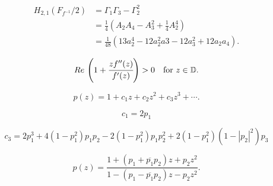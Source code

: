 \documentclass[10pt,a4paper]{amsart}
\begin{document}
\begin{equation}\label{hankel}
\begin{aligned}
	H_{2,1}(F_{f^{-1}}/2)
&=\Gamma_1\Gamma_3-\Gamma_{2}^2 \\[2mm]
&=\frac{1}{4}\left(A_2A_4-A_3^2+\frac{1}{4}A_2^4\right)\\[2mm]
&=\frac{1}{48}\left(13a_2^4-12a_2^2a3-12a_3^2+12a_2a_4\right).
\end{aligned}
\end{equation}

\begin{equation}\label{convex}
{\rm Re\,}\left( 1+\cfrac{zf''(z)}{f'(z)} \right) > 0 \quad \text{for}\,\, z \in \mathbb{D}.
\end{equation}

\begin{equation}\label{p}
p(z)=1+c_{1} z+c_{2} z^{2}+c_{3} z^{3}+ \cdots .
\end{equation}

\begin{equation}\label{c1}
 c_{1}=2 p_{1}
 \end{equation}

\begin{equation}\label{c3}
c_{3}=2 p_{1}^{3}+4\left(1-p_{1}^{2}\right) p_{1} p_{2}-2\left(1-p_{1}^{2}\right) p_{1} p_{2}^{2}+2\left(1-p_{1}^{2}\right)\left(1-\left|p_{2}\right|^{2}\right) p_{3}
\end{equation}

\begin{equation}\label{second}
p(z)=\frac{1+\left(p_{1}+\overline{p_{1}} p_{2}\right) z+p_{2} z^{2}}{1-\left(p_{1}-\overline{p_{1}} p_{2}\right) z-p_{2} z^{2}} .
\end{equation}
\end{document}
